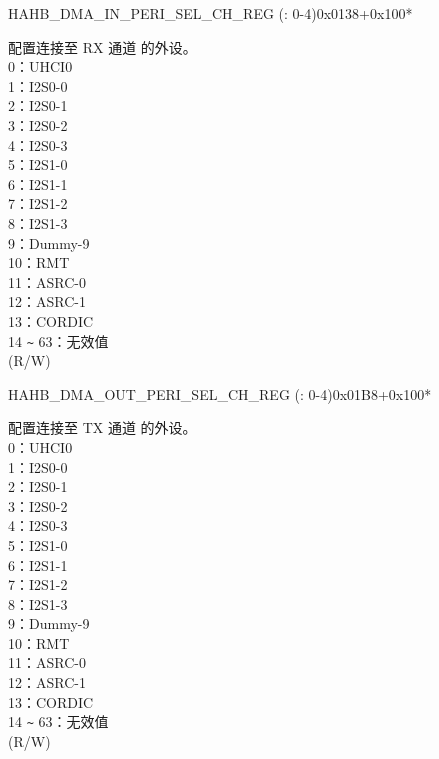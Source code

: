 \begin{register}{H}{AHB\_DMA\_IN\_PERI\_SEL\_CH\_REG (: 0-4)}{0x0138+0x100*}\label{regdesc:AHBDMAINPERISELCHNREG}
%
%
\regnewline%
\begin{regdesc}\begin{reglist}
\label{fielddesc:AHBDMAPERIINSELCHN}\item [AHB\_DMA\_PERI\_IN\_SEL\_CH\regindex{n}] 配置连接至 RX 通道  的外设。\\ 0：UHCI0\\ 1：I2S0-0\\ 2：I2S0-1\\ 3：I2S0-2\\ 4：I2S0-3\\ 5：I2S1-0\\ 6：I2S1-1\\ 7：I2S1-2\\ 8：I2S1-3\\ 9：Dummy-9\\ 10：RMT\\ 11：ASRC-0\\ 12：ASRC-1\\ 13：CORDIC\\ 14 \verb+~+ 63：无效值\\ (R/W)
\end{reglist}\end{regdesc}
\end{register}


\begin{register}{H}{AHB\_DMA\_OUT\_PERI\_SEL\_CH\_REG (: 0-4)}{0x01B8+0x100*}\label{regdesc:AHBDMAOUTPERISELCHNREG}
%
%
\regnewline%
\begin{regdesc}\begin{reglist}
\label{fielddesc:AHBDMAPERIOUTSELCHN}\item [AHB\_DMA\_PERI\_OUT\_SEL\_CH\regindex{n}] 配置连接至 TX 通道  的外设。\\ 0：UHCI0\\ 1：I2S0-0\\ 2：I2S0-1\\ 3：I2S0-2\\ 4：I2S0-3\\ 5：I2S1-0\\ 6：I2S1-1\\ 7：I2S1-2\\ 8：I2S1-3\\ 9：Dummy-9\\ 10：RMT\\ 11：ASRC-0\\ 12：ASRC-1\\ 13：CORDIC\\ 14 \verb+~+ 63：无效值\\ (R/W)
\end{reglist}\end{regdesc}
\end{register}
